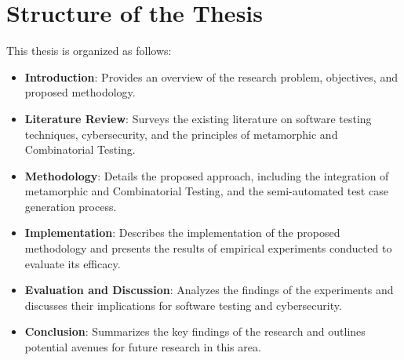 \section{Structure of the Thesis}\label{sec:structure-of-the-thesis}

This thesis is organized as follows:

\begin{itemize}
    \item \textbf{Introduction}: Provides an overview of the research problem, objectives, and proposed methodology.
    \item \textbf{Literature Review}: Surveys the existing literature on software testing techniques, cybersecurity, and the principles of metamorphic and Combinatorial Testing.
    \item \textbf{Methodology}: Details the proposed approach, including the integration of metamorphic and Combinatorial Testing, and the semi-automated test case generation process.
    \item \textbf{Implementation}: Describes the implementation of the proposed methodology and presents the results of empirical experiments conducted to evaluate its efficacy.
    \item \textbf{Evaluation and Discussion}: Analyzes the findings of the experiments and discusses their implications for software testing and cybersecurity.
    \item \textbf{Conclusion}: Summarizes the key findings of the research and outlines potential avenues for future research in this area.
\end{itemize}
